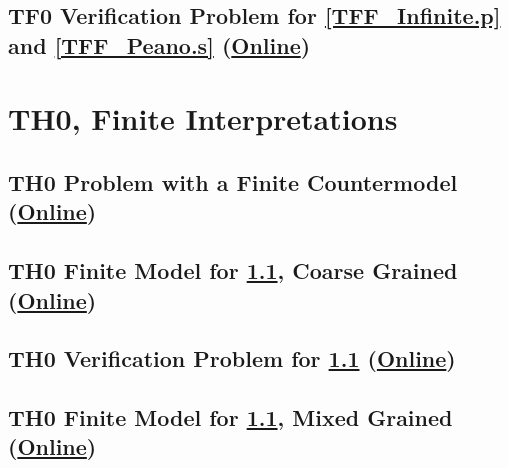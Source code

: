 \documentclass{easychair}
\begin{document}
\newpage
\subsection{TF0 Verification Problem for \ref{TFF_Infinite.p} and \ref{TFF_Peano.s}
(\href{https://raw.githubusercontent.com/GeoffsPapers/InterpretationFormat/master/Examples/TFF_Peano.s.p}{Online})}
\label{TFF_Peano.s.p}
\begin{small}

\end{small}

\newpage
\section{TH0, Finite Interpretations}
\label{TH0Finite}

\subsection{TH0 Problem with a Finite Countermodel
(\href{https://raw.githubusercontent.com/GeoffsPapers/InterpretationFormat/master/Examples/THF_Finite.p}{Online})}
\label{THF_Finite.p}
\begin{small}

\end{small}

\newpage
\subsection{TH0 Finite Model for \ref{THF_Finite.p}, Coarse Grained
(\href{https://raw.githubusercontent.com/GeoffsPapers/InterpretationFormat/master/Examples/THF_Finite.s}{Online})}
\label{THF_Finite.s}
\begin{small}

\end{small}

\newpage
\subsection{TH0 Verification Problem for \ref{THF_Finite.p}
(\href{https://raw.githubusercontent.com/GeoffsPapers/InterpretationFormat/master/Examples/THF_Finite.s.p}{Online})}
\label{THF_Finite.s.p}
\begin{small}

\end{small}

\newpage
\subsection{TH0 Finite Model for \ref{THF_Finite.p}, Mixed Grained
(\href{https://raw.githubusercontent.com/GeoffsPapers/InterpretationFormat/master/Examples/THF_Finite_Medium.s}{Online})}
\label{THF_Finite_Medium.s}
\begin{small}

\end{small}
\end{document}
